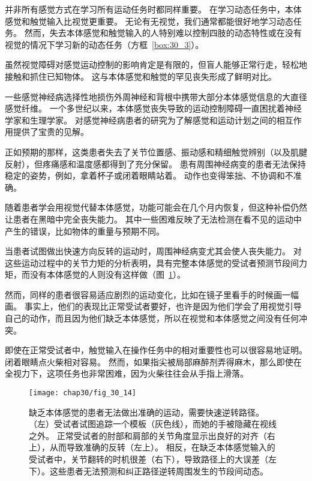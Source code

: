 并非所有感觉方式在学习所有运动任务时都同样重要。
在学习动态任务中，本体感觉和触觉输入比视觉更重要。 无论有无视觉，我们通常都能很好地学习动态任务。
然而，失去本体感觉和触觉输入的人特别难以控制四肢的动态特性或在没有视觉的情况下学习新的动态任务（方框~\ref{box:30_3}）。


\begin{proposition}[本体感觉和触觉对感觉运动控制至关重要] \label{box:30_3}
	
	\quad \quad 虽然视觉障碍对感觉运动控制的影响肯定是有限的，但盲人能够正常行走，轻松地接触和抓住已知物体。
	这与本体感觉和触觉的罕见丧失形成了鲜明对比。
	
	\quad \quad 一些感觉神经病选择性地损伤外周神经和背根中携带大部分本体感觉信息的大直径感觉纤维。
	一个多世纪以来，本体感觉丧失导致的运动控制障碍一直困扰着神经学家和生理学家。
	对感觉神经病患者的研究为了解感觉和运动计划之间的相互作用提供了宝贵的见解。
	
	\quad \quad 正如预期的那样，这类患者失去了关节位置感、振动感和精细触觉辨别（以及肌腱反射），但疼痛感和温度感都得到了充分保留。
	患有周围神经病变的患者无法保持稳定的姿势，例如，拿着杯子或闭着眼睛站着。
	动作也变得笨拙、不协调和不准确。
	
	\quad \quad 随着患者学会用视觉代替本体感觉，功能可能会在几个月内恢复，但这种补偿仍然让患者在黑暗中完全丧失能力。
	其中一些困难反映了无法检测在看不见的运动中产生的错误，比如物体的重量与预期不同。
	
	\quad \quad 当患者试图做出快速方向反转的运动时，周围神经病变尤其会使人丧失能力。
	对这些运动过程中的关节力矩的分析表明，具有完整本体感觉的受试者预测节段间力矩，而没有本体感觉的人则没有这样做（图~\ref{fig:30_14}）。
	
	\quad \quad 然而，同样的患者很容易适应剧烈的运动变化，比如在镜子里看手的时候画一幅画。
	事实上，他们的表现比正常受试者要好，也许是因为他们学会了用视觉引导自己的动作，而且因为他们缺乏本体感觉，所以在视觉和本体感觉之间没有任何冲突。
	
	\quad \quad 即使在正常受试者中，触觉输入在操作任务中的相对重要性也可以很容易地证明。
	闭着眼睛点火柴相对容易。
	然而，如果指尖被局部麻醉剂弄得麻木，那么即使在全视力下，这项任务也非常困难，因为火柴往往会从手指上滑落。
	
\end{proposition}


\begin{figure}[htbp]
	\centering
	\texttt{[image: chap30/fig\_30\_14]}
	\caption{缺乏本体感觉的患者无法做出准确的运动，需要快速逆转路径。
		（左）受试者试图追踪一个模板（灰色线），而她的手被隐藏在视线之外。
		正常受试者的肘部和肩部的关节角度显示出良好的对齐（右上），从而导致准确的反转（左上）。
		相反，在缺乏本体感觉输入的受试者中，关节翻转的时机很差（右下），导致路径上的大误差（左下）。这些患者无法预测和纠正路径逆转周围发生的节段间动态。}
	\label{fig:30_14}
\end{figure}


